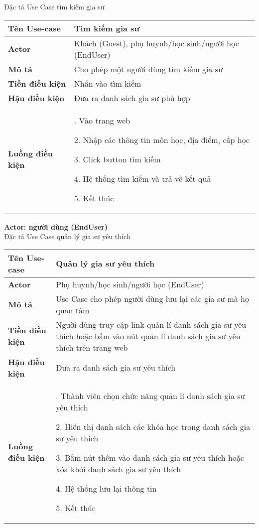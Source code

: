 \documentclass[12pt,a4paper]{report}
\begin{document}
 Đặc tả Use Case tìm kiếm gia sư
 \begin{center}
 \begin{tabular}{|>{\raggedright\arraybackslash}m{4cm}|>{\raggedright\arraybackslash}m{11.5cm}|}
 \hline 
 \textbf{Tên Use-case} & Tìm kiếm gia sư \\ 
 \hline 
 \textbf{Actor} & Khách (Guest), phụ huynh/học sinh/người học (EndUser) \\ 
 \hline 
\textbf{ Mô tả} & Cho phép một người dùng tìm kiếm gia sư \\ 
 \hline 
 \textbf{Tiền điều kiện} & Nhấn vào tìm kiếm\\ 
 \hline 
 \textbf{Hậu điều kiện} & Đưa ra danh sách gia sư phù hợp \\ 
 \hline 
 \textbf{Luồng điều kiện} & 1. Vào trang web
 
				   2. Nhập các thông tin môn học, địa điểm, cấp học

			       3. Click button tìm kiếm

				   4. Hệ thống tìm kiếm và trả về kết quả
				   
				   5. Kết thúc\\ 
 \hline  
 \end{tabular} 
 \end{center}

\newpage
\textbf{ Actor: người dùng (EndUser)}\\

Đặc tả Use Case quản lý gia sư yêu thích
\begin{center}
 \begin{tabular}{|>{\raggedright\arraybackslash}m{4cm}|>{\raggedright\arraybackslash}m{11.5cm}|}
 \hline 
 \textbf{Tên Use-case} & Quản lý gia sư yêu thích \\ 
 \hline 
 \textbf{Actor} & Phụ huynh/học sinh/người học (EndUser) \\ 
 \hline 
\textbf{ Mô tả} & Use Case cho phép người dùng lưu lại các gia sư mà họ quan tâm \\ 
 \hline 
 \textbf{Tiền điều kiện} & Người dùng truy cập link quản lí danh sách gia sư yêu thích hoặc bấm vào nút quản lí danh sách gia sư yêu thích trên trang web\\ 
 \hline 
 \textbf{Hậu điều kiện} & Đưa ra danh sách gia sư yêu thích \\ 
 \hline 
 \textbf{Luồng điều kiện} & 1. Thành viên chọn chức năng quản lí danh sách gia sư yêu thích 
 
				   2. Hiển thị danh sách các khóa học trong danh sách gia sư yêu thích

			       3. Bấm nút thêm vào danh sách gia sư yêu thích hoặc xóa khỏi danh sách gia sư yêu thích

				   4. Hệ thống lưu lại thông tin
				   
				   5. Kết thúc\\ 
 \hline  
 \end{tabular} 
 \end{center}
\end{document}
